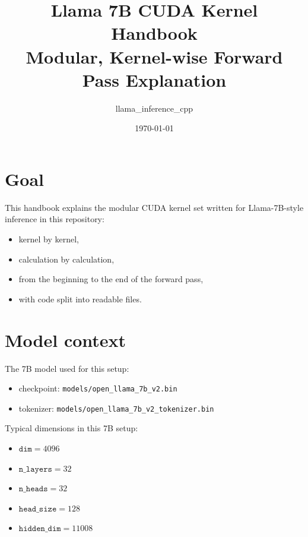 \documentclass[11pt]{article}
\title{Llama 7B CUDA Kernel Handbook\\\large Modular, Kernel-wise Forward Pass Explanation}
\author{llama\_inference\_cpp}
\date{\today}
\begin{document}
\maketitle
\tableofcontents
\newpage

\section{Goal}
This handbook explains the modular CUDA kernel set written for Llama-7B-style inference in this repository:
\begin{itemize}[leftmargin=*]
  \item kernel by kernel,
  \item calculation by calculation,
  \item from the beginning to the end of the forward pass,
  \item with code split into readable files.
\end{itemize}

\section{Model context}
The 7B model used for this setup:
\begin{itemize}[leftmargin=*]
  \item checkpoint: \texttt{models/open\_llama\_7b\_v2.bin}
  \item tokenizer: \texttt{models/open\_llama\_7b\_v2\_tokenizer.bin}
\end{itemize}

Typical dimensions in this 7B setup:
\begin{itemize}[leftmargin=*]
  \item \(\texttt{dim}=4096\)
  \item \(\texttt{n\_layers}=32\)
  \item \(\texttt{n\_heads}=32\)
  \item \(\texttt{head\_size}=128\)
  \item \(\texttt{hidden\_dim}=11008\)
\end{itemize}
\end{document}

